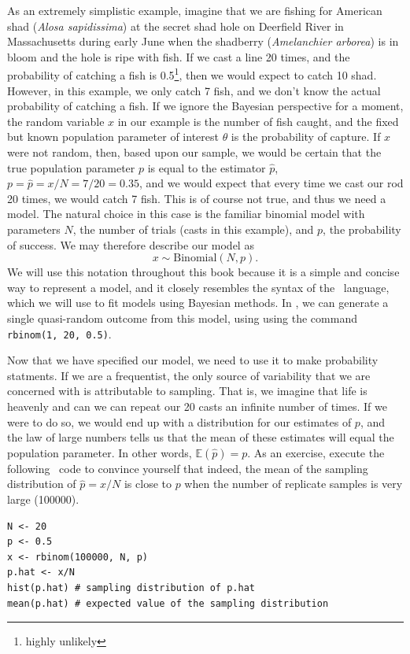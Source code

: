 As an extremely simplistic example, imagine that we are fishing for
American shad (\emph{Alosa sapidissima}) at the secret shad
hole on Deerfield River in Massachusetts during early June when the
shadberry (\emph{Amelanchier arborea}) is in bloom and the hole is ripe
with fish. If we cast a line 20 times, and the probability of
catching a fish is 0.5\footnote{highly unlikely}, then we would expect
to catch 10 shad. However, in this example, we only catch 7 fish, and
we don't know the actual probability of catching a fish. If we ignore
the Bayesian perspective for a moment, the random variable $x$ in our
example is the
number of fish caught, and the fixed but known population
parameter of interest $\theta$ is the probability of
capture. If $x$ were not random, then, based upon our sample, we would be
certain that the true population parameter $p$ is equal to the
estimator $\hat{p}$, $p = \hat{p} = x/N = 7/20 = 0.35$, and
we would expect that every
time we cast our rod 20 times, we would catch 7 fish. This is of
course not true, and thus we need a model. The natural
choice in this case is the familiar binomial model with parameters
$N$, the number of trials (casts in this example), and $p$, the
probability of success. We may therefore describe our model as
\[
x \sim \mbox{Binomial}(N, p).
\]
We will use this notation throughout this book because it is a simple
and concise way to represent a model, and it closely resembles the
syntax of the \bugs~language, which we will use to fit models using
Bayesian methods. In \R, we can generate a single quasi-random outcome from this
model, using using the command \verb+rbinom(1, 20, 0.5)+.

Now that we have specified our model, we need to use it to make
probability statments. If we are a frequentist, the only source of
variability that we are concerned with is attributable to
sampling. That is, we imagine that life is heavenly and
can we can repeat our 20 casts an infinite number of times. If we were
to do so, we would end up with a distribution for our estimates of $p$, and
the law of large numbers tells us that the mean of these estimates
will equal the population parameter. In other words,
$\mathbb{E}(\hat{p}) = p$. As an
exercise, execute the following
\R~code to convince yourself that indeed, the mean of the sampling
distribution of $\hat{p}=x/N$ is close to $p$ when the
number of replicate samples is very large (100000).
\begin{verbatim}
N <- 20
p <- 0.5
x <- rbinom(100000, N, p)
p.hat <- x/N
hist(p.hat) # sampling distribution of p.hat
mean(p.hat) # expected value of the sampling distribution
\end{verbatim}

